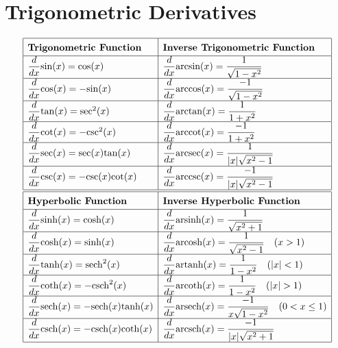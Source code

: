 \section{Trigonometric Derivatives}
$$
\setlength{\tabcolsep}{8pt} %
\renewcommand{\arraystretch}{1.5} %
\begin{array}{|l|l|}
\hline
\textbf{Trigonometric Function} & \textbf{Inverse Trigonometric Function} \\ \hline
\dfrac{d}{dx} \text{sin}(x) = \text{cos}(x) & \dfrac{d}{dx} \text{arcsin}(x) = \dfrac{1}{\sqrt{1 - x^2}} \\ \hline
\dfrac{d}{dx} \text{cos}(x) = -\text{sin}(x) & \dfrac{d}{dx} \text{arccos}(x) = \dfrac{-1}{\sqrt{1 - x^2}} \\ \hline
\dfrac{d}{dx} \text{tan}(x) = \text{sec}^2(x) & \dfrac{d}{dx} \text{arctan}(x) = \dfrac{1}{1 + x^2} \\ \hline
\dfrac{d}{dx} \text{cot}(x) = -\text{csc}^2(x) & \dfrac{d}{dx} \text{arccot}(x) = \dfrac{-1}{1 + x^2} \\ \hline
\dfrac{d}{dx} \text{sec}(x) = \text{sec}(x)\text{tan}(x) & \dfrac{d}{dx} \text{arcsec}(x) = \dfrac{1}{|x|\sqrt{x^2 - 1}} \\ \hline
\dfrac{d}{dx} \text{csc}(x) = -\text{csc}(x)\text{cot}(x) & \dfrac{d}{dx} \text{arccsc}(x) = \dfrac{-1}{|x|\sqrt{x^2 - 1}} \\ \hline
\hline
\textbf{Hyperbolic Function} & \textbf{Inverse Hyperbolic Function} \\ \hline
\dfrac{d}{dx} \text{sinh}(x) = \text{cosh}(x) & \dfrac{d}{dx} \text{arsinh}(x) = \dfrac{1}{\sqrt{x^2 + 1}} \\ \hline
\dfrac{d}{dx} \text{cosh}(x) = \text{sinh}(x) & \dfrac{d}{dx} \text{arcosh}(x) = \dfrac{1}{\sqrt{x^2 - 1}} \quad (x > 1) \\ \hline
\dfrac{d}{dx} \text{tanh}(x) = \text{sech}^2(x) & \dfrac{d}{dx} \text{artanh}(x) = \dfrac{1}{1 - x^2} \quad (|x| < 1) \\ \hline
\dfrac{d}{dx} \text{coth}(x) = -\text{csch}^2(x) & \dfrac{d}{dx} \text{arcoth}(x) = \dfrac{1}{1 - x^2} \quad (|x| > 1) \\ \hline
\dfrac{d}{dx} \text{sech}(x) = -\text{sech}(x)\text{tanh}(x) & \dfrac{d}{dx} \text{arsech}(x) = \dfrac{-1}{x\sqrt{1 - x^2}} \quad (0 < x \leq 1) \\ \hline
\dfrac{d}{dx} \text{csch}(x) = -\text{csch}(x)\text{coth}(x) & \dfrac{d}{dx} \text{arcsch}(x) = \dfrac{-1}{|x|\sqrt{x^2 + 1}} \\ \hline
\end{array}
$$